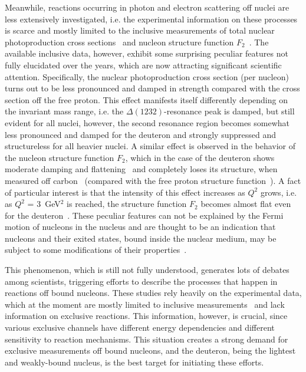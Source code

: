 Meanwhile, reactions occurring in photon and electron scattering off nuclei are less extensively investigated, i.e. the experimental information on these processes is scarce and mostly limited to the inclusive measurements of total nuclear photoproduction cross sections~\cite{Mokeev:1995fy,Bianchi:1994ax,Ahrens:1986hn} and nucleon structure function $F_{2}$~\cite{Osipenko_2005_note,Osipenko:2005gt,Osipenko:2010sb}. The available inclusive data, however, exhibit some surprising peculiar features not fully elucidated over the years, which are now attracting significant scientific attention. Specifically, the nuclear photoproduction cross section (per nucleon) turns out to be less pronounced and damped in strength compared with the cross section off the free proton. This effect manifests itself differently depending on the invariant mass range, i.e. the $\Delta(1232)$-resonance peak is damped, but still evident for all nuclei, however, the second resonance region becomes somewhat less pronounced and damped for the deuteron and strongly suppressed and structureless for all heavier nuclei. A similar effect is observed in the behavior of the nucleon structure function $F_{2}$, which in the case of the deuteron shows moderate damping and flattening~\cite{Osipenko:2005gt} and completely loses its structure, when measured off carbon~\cite{Osipenko:2010sb} (compared with the free proton structure function~\cite{Osipenko:2003bu}). A fact of particular interest is that the intensity of this effect increases as $Q^{2}$ grows, i.e. as $Q^{2}$ = 3~GeV$^{2}$ is reached, the structure function $F_{2}$ becomes almost flat even for the deuteron~\cite{Osipenko:2010sb}. These peculiar features can not be explained by the Fermi motion of nucleons in the nucleus and are thought to be an indication that nucleons and their exited states, bound inside the nuclear medium, may be subject to some modifications of their properties~\cite{Mokeev:1995fy,Bianchi:1994ax,Ahrens:1986hn,Krusche:2004xz,Noble:1980my}. 



This phenomenon, which is still not fully understood, generates lots of debates among scientists, triggering efforts to describe the processes that happen in reactions off bound nucleons. These studies rely heavily on the experimental data, which at the moment are mostly limited to inclusive measurements~\cite{Mokeev:1995fy,Bianchi:1994ax,Ahrens:1986hn,Osipenko_2005_note,Osipenko:2005gt,Osipenko:2010sb} and lack information on exclusive reactions. This information, however, is crucial, since various exclusive channels have different energy dependencies and different sensitivity to reaction mechanisms. This situation creates a strong demand for exclusive measurements off bound nucleons, and the deuteron, being the lightest and weakly-bound nucleus, is the best target for initiating these efforts.



